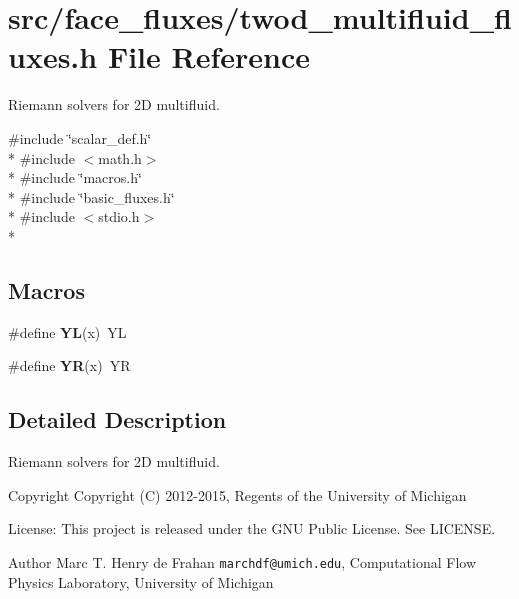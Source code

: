 \section{src/face\-\_\-fluxes/twod\-\_\-multifluid\-\_\-fluxes.h File Reference}
\label{twod__multifluid__fluxes_8h}


Riemann solvers for 2\-D multifluid.  


{\ttfamily \#include \char`\"{}scalar\-\_\-def.\-h\char`\"{}}\\*
{\ttfamily \#include $<$math.\-h$>$}\\*
{\ttfamily \#include \char`\"{}macros.\-h\char`\"{}}\\*
{\ttfamily \#include \char`\"{}basic\-\_\-fluxes.\-h\char`\"{}}\\*
{\ttfamily \#include $<$stdio.\-h$>$}\\*
\subsection*{Macros}
\begin{DoxyCompactItemize}
\item 
\#define {\bfseries Y\-L}(x)~Y\-L\label{twod__multifluid__fluxes_8h_a77cb2523048b3756423bcc1051e4f30c}

\item 
\#define {\bfseries Y\-R}(x)~Y\-R\label{twod__multifluid__fluxes_8h_ac574c67246847dfb54604debb74f7e95}

\end{DoxyCompactItemize}


\subsection{Detailed Description}
Riemann solvers for 2\-D multifluid. \begin{DoxyCopyright}{Copyright}
Copyright (C) 2012-\/2015, Regents of the University of Michigan 
\end{DoxyCopyright}
\begin{DoxyParagraph}{License\-:}
This project is released under the G\-N\-U Public License. See L\-I\-C\-E\-N\-S\-E. 
\end{DoxyParagraph}
\begin{DoxyAuthor}{Author}
Marc T. Henry de Frahan {\tt marchdf@umich.\-edu}, Computational Flow Physics Laboratory, University of Michigan 
\end{DoxyAuthor}
